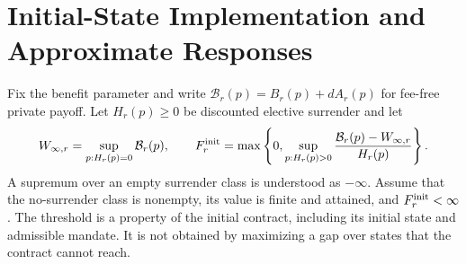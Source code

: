 \section{Initial-State Implementation and Approximate Responses}
\label{sec:r19-enforcement}
Fix the benefit parameter and write $\mathcal B_r(p)=B_r(p)+dA_r(p)$ for fee-free private payoff. Let $H_r(p)\geq0$ be discounted elective surrender and let
\begin{equation}
 W_{\infty,r}=\sup_{p:H_r(p)=0}\mathcal B_r(p),\qquad
 F^{\rm init}_r=\max\left\{0,\sup_{p:H_r(p)>0}\frac{\mathcal B_r(p)-W_{\infty,r}}{H_r(p)}\right\}.
 \label{eq:r19-initial-threshold}
\end{equation}
A supremum over an empty surrender class is understood as $-\infty$. Assume that the no-surrender class is nonempty, its value is finite and attained, and $F^{\rm init}_r<\infty$. The threshold is a property of the initial contract, including its initial state and admissible mandate. It is not obtained by maximizing a gap over states that the contract cannot reach.

